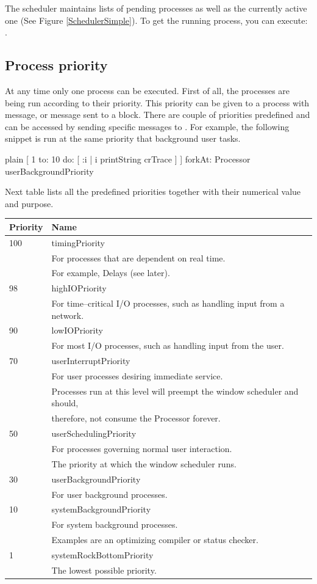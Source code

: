 \documentclass[10pt,twoside,english]{_support/latex/sbabook/sbabook}
\begin{document}
The scheduler maintains lists of pending processes as well as the currently active one (See Figure \ref{SchedulerSimple}).  
To get the running process, you can execute: .
\subsection{Process priority}
At any time only one process can be executed. First of all, the processes are being run according to their priority. This priority can be given to a process with  message, or  message sent to a block. There are couple of priorities predefined and can be accessed by sending specific messages to . For example, the following snippet is run at the same priority that background user tasks.

\begin{displaycode}{plain}
[ 1 to: 10 do: [ :i | i  printString crTrace ]
	] forkAt: Processor userBackgroundPriority
\end{displaycode}

Next table lists all the predefined priorities together with their numerical value and purpose.

\begin{tabular}{lll}
\toprule
\textbf{Priority} & \textbf{Name} &  \\
\midrule
100 & timingPriority &  \\
 & For processes that are dependent on real time. \\
 & For example, Delays (see later). \\
98 & highIOPriority &  \\
 & For time–critical I/O processes, such as handling input from a network. \\
90 & lowIOPriority &  \\
 & For most I/O processes, such as handling input from the user. \\
70 & userInterruptPriority &  \\
 & For user processes desiring immediate service. \\
 & Processes run at this level will preempt the window scheduler and should, \\
 & therefore, not consume the Processor forever. \\
50 & userSchedulingPriority &  \\
 & For processes governing normal user interaction. \\
 & The priority at which the window scheduler runs. \\
30 & userBackgroundPriority \\
 & For user background processes. \\
10 & systemBackgroundPriority \\
 & For system background processes. \\
 & Examples are an optimizing compiler or status checker. \\
1 & systemRockBottomPriority \\
 & The lowest possible priority. \\
\bottomrule
\end{tabular}
\end{document}
